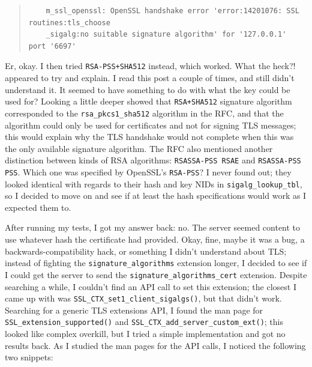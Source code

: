 \documentclass{article}
\begin{document}
\begin{quote}
\begin{verbatim}
	m_ssl_openssl: OpenSSL handshake error 'error:14201076: SSL routines:tls_choose
	_sigalg:no suitable signature algorithm' for '127.0.0.1' port '6697'
\end{verbatim}
\end{quote}

Er, okay.  I then tried \texttt{RSA-PSS+SHA512} instead, which worked.  What the heck?!   appeared to try and explain.  I read this post a couple of times, and still didn't understand it.  It seemed to have something to do with what the key could be used for?  Looking a little deeper showed that \texttt{RSA+SHA512} signature algorithm corresponded to the \texttt{rsa_pkcs1_sha512} algorithm in the RFC, and that the algorithm could only be used for certificates and not for signing TLS messages; this would explain why the TLS handshake would not complete when this was the only available signature algorithm.  The RFC also mentioned another distinction between kinds of RSA algorithms: \texttt{RSASSA-PSS RSAE} and \texttt{RSASSA-PSS PSS}.  Which one was specified by OpenSSL's \texttt{RSA-PSS}?  I never found out; they looked identical with regards to their hash and key NIDs in \texttt{sigalg_lookup_tbl}, so I decided to move on and see if at least the hash specifications would work as I expected them to.

After running my tests, I got my answer back: no.  The server seemed content to use whatever hash the certificate had provided.  Okay, fine, maybe it was a bug, a backwards-compatibility hack, or something I didn't understand about TLS; instead of fighting the \texttt{signature_algorithms} extension longer, I decided to see if I could get the server to send the \texttt{signature_algorithms_cert} extension.  Despite searching a while, I couldn't find an API call to set this extension; the closest I came up with was \texttt{SSL_CTX_set1_client_sigalgs()}, but that didn't work.  Searching for a generic TLS extensions API, I found the man page for \texttt{SSL_extension_supported()} and \texttt{SSL_CTX_add_server_custom_ext()}; this looked like complex overkill, but I tried a simple implementation and got no results back.  As I studied the man pages for the API calls, I noticed the following two snippets:
\end{document}
